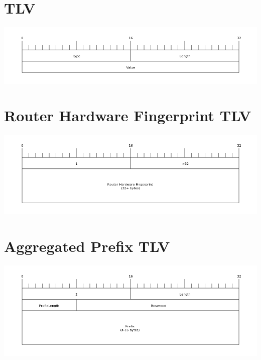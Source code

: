 \section{TLV}
\begin{center}
	\includegraphics[width=\linewidth]{../Diagrams/Packets/tlv.png}
\end{center}

\section{Router Hardware Fingerprint TLV}
\begin{center}
	\includegraphics[width=\linewidth]{../Diagrams/Packets/rhwfp_tlv.png}
\end{center}

\section{Aggregated Prefix TLV}
\begin{center}
	\includegraphics[width=\linewidth]{../Diagrams/Packets/aggregated_prefix_tlv.png}
\end{center}

